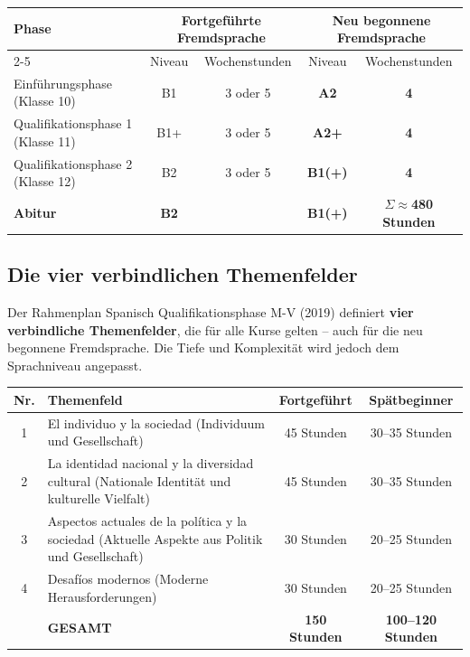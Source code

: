 \documentclass[10pt,a4paper]{article}
\begin{document}
\begin{center}
\small
\begin{tabular}{|l|c|c|c|c|}
\hline
\rowcolor{lightgray}
\textbf{Phase} & \multicolumn{2}{c|}{\textbf{Fortgeführte Fremdsprache}} & \multicolumn{2}{c|}{\textbf{Neu begonnene Fremdsprache}} \\
\cline{2-5}
\rowcolor{lightgray}
& Niveau & Wochenstunden & Niveau & Wochenstunden \\
\hline
Einführungsphase (Klasse 10) & B1 & 3 oder 5 & \textcolor{spaet}{\textbf{A2}} & \textcolor{spaet}{\textbf{4}} \\
\hline
Qualifikationsphase 1 (Klasse 11) & B1+ & 3 oder 5 & \textcolor{spaet}{\textbf{A2+}} & \textcolor{spaet}{\textbf{4}} \\
\hline
Qualifikationsphase 2 (Klasse 12) & B2 & 3 oder 5 & \textcolor{spaet}{\textbf{B1(+)}} & \textcolor{spaet}{\textbf{4}} \\
\hline
\textbf{Abitur} & \textbf{B2} & & \textcolor{spaet}{\textbf{B1(+)}} & $\Sigma\approx$\textbf{480 Stunden} \\
\hline
\end{tabular}
\end{center}

\subsection{Die vier verbindlichen Themenfelder}

Der Rahmenplan Spanisch Qualifikationsphase M-V (2019) definiert \textbf{vier verbindliche Themenfelder}, die für alle Kurse gelten -- auch für die neu begonnene Fremdsprache. Die Tiefe und Komplexität wird jedoch dem Sprachniveau angepasst.

\begin{center}
\small
\begin{tabular}{|c|p{6cm}|c|c|}
\hline
\rowcolor{lightgray}
\textbf{Nr.} & \textbf{Themenfeld} & \textbf{Fortgeführt} & \textbf{Spätbeginner} \\
\hline
1 & El individuo y la sociedad (Individuum und Gesellschaft) & 45 Stunden & \textcolor{spaet}{30--35 Stunden} \\
\hline
2 & La identidad nacional y la diversidad cultural (Nationale Identität und kulturelle Vielfalt) & 45 Stunden & \textcolor{spaet}{30--35 Stunden} \\
\hline
3 & Aspectos actuales de la política y la sociedad (Aktuelle Aspekte aus Politik und Gesellschaft) & 30 Stunden & \textcolor{spaet}{20--25 Stunden} \\
\hline
4 & Desafíos modernos (Moderne Herausforderungen) & 30 Stunden & \textcolor{spaet}{20--25 Stunden} \\
\hline
\rowcolor{lightspaet}
& \textbf{GESAMT} & \textbf{150 Stunden} & \textcolor{spaet}{\textbf{100--120 Stunden}} \\
\hline
\end{tabular}
\end{center}
\end{document}

